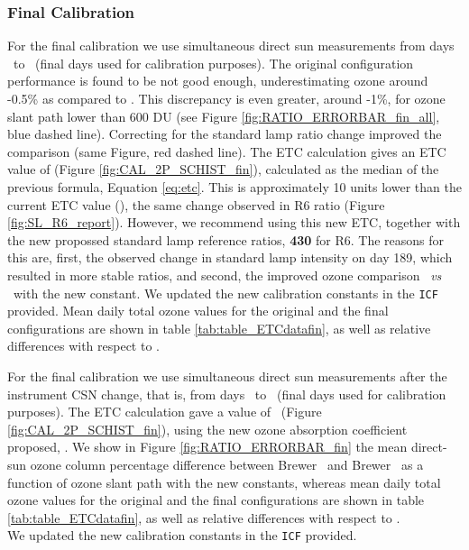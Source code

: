 \subsubsection{Final Calibration}
For the final calibration we use \textbf{\NobsCalfin} simultaneous direct sun measurements from days \textbf{\FINALINI}\ to \textbf{\FINALEND}\ (final days used for calibration purposes). 
The original configuration performance is found to be not good enough, underestimating ozone around -0.5\% as compared to \brwref. This discrepancy is even greater, around -1\%, for ozone slant path lower than 600 DU (see Figure \ref{fig:RATIO_ERRORBAR_fin_all}, blue dashed line). Correcting for the standard lamp ratio change improved the comparison (same Figure, red dashed line). The ETC calculation gives an ETC value of \textbf{\ETCdef} (Figure \ref{fig:CAL_2P_SCHIST_fin}), calculated as the median of the previous formula, Equation \ref{eq:etc}. This is approximately 10 units lower than the current ETC value (\textbf{\ETCorig}), the same change observed in R6 ratio (Figure \ref{fig:SL_R6_report}). However, we recommend using this new ETC, together with the new propossed standard lamp reference ratios, \textbf{430} for R6. The reasons for this are, first, the observed change in standard lamp intensity on day 189, which resulted in more stable ratios, and second, the improved ozone comparison \brwname\ \emph{vs} \brwref\ with the new constant. We updated the new calibration constants in the \texttt{ICF} provided.
Mean daily total ozone values for the original and the final configurations are shown in table \ref{tab:table_ETCdatafin}, as well as relative differences with respect to \brwref.


For the final calibration we use \textbf{\NobsCalfin} simultaneous direct sun measurements after the instrument CSN change, that is, from days \textbf{\FINALINI}\ to \textbf{\FINALEND}\ (final days used for calibration purposes). The ETC calculation gave a value of \textbf{\ETCfin}\ (Figure \ref{fig:CAL_2P_SCHIST_fin}), using the new ozone absorption coefficient proposed, \textbf{\Adef}. We show in Figure \ref{fig:RATIO_ERRORBAR_fin} the mean direct-sun ozone column percentage difference between Brewer \brwname\ and Brewer \brwref\ as a function of ozone slant path with the new constants, whereas mean daily total ozone values for the original and the final configurations are shown in table \ref{tab:table_ETCdatafin}, as well as relative differences with respect to \brwref.\\
We updated the new calibration constants in the \texttt{ICF} provided.


